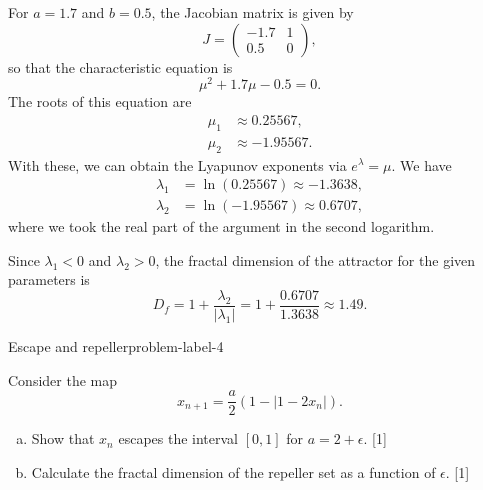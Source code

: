 \begin{enumerate}[(a)]
    For $a=1.7$ and $b=0.5$, the Jacobian matrix is given by
    \[
    J = \begin{pmatrix}
        -1.7 & 1 \\
        0.5 & 0
    \end{pmatrix},
    \]
    so that the characteristic equation is
    \[
    \mu^2 + 1.7\mu - 0.5 = 0.
    \]
    The roots of this equation are
    \begin{align*}
        \mu_{1} & \approx 0.25567,\\
        \mu_{2} & \approx -1.95567.
    \end{align*}
    With these, we can obtain the Lyapunov exponents via $e^{\lambda} = \mu$. We have
    \begin{align*}
        \lambda_{1} & = \ln(0.25567) \approx -1.3638,\\
        \lambda_{2} & = \ln(-1.95567) \approx 0.6707,
    \end{align*}
    where we took the real part of the argument in the second logarithm.

    Since $\lambda_{1} < 0$ and $\lambda_{2} > 0$, the fractal dimension of the attractor 
    for the given parameters is
    \[
    \boxed{
        D_f = 1 + \frac{\lambda_2}{|\lambda_1|} = 1 + \frac{0.6707}{1.3638} \approx 1.49.
    }
    \]
\end{enumerate}

\begin{problem}{Escape and repeller}{problem-label-4}

Consider the map
\[
x_{n+1} = \frac{a}{2}\left(1-|1-2x_n|\right).
\]

\begin{enumerate}[(a)]
    \item Show that $x_n$ escapes the interval $[0,1]$ for $a=2+\epsilon$. [1]
    \item Calculate the fractal dimension of the repeller set as a function of $\epsilon$. [1]
\end{enumerate}

\end{problem}

